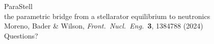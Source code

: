 \documentclass[aspectratio=169]{beamer}
\begin{document}
\begin{frame}[plain]
  \begin{center}
    {\Large\color{key} ParaStell}\\[4pt]
    \small the parametric bridge from a stellarator equilibrium to neutronics\\[10pt]
    \footnotesize Moreno, Bader \& Wilson, \emph{Front.\ Nucl.\ Eng.}\ \textbf{3}, 1384788 (2024)\\
    \footnotesize Questions?
  \end{center}
\end{frame}
\end{document}
